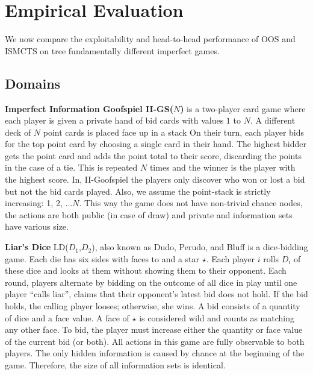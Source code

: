 \section{Empirical Evaluation}


We now compare the exploitability  and head-to-head performance
of OOS and ISMCTS on tree fundamentally different imperfect games. %

\subsection{Domains}

\textbf{Imperfect Information Goofspiel II-GS($N$)} is a two-player card game where each player is
given a private hand of bid cards with values $1$ to $N$. A different
deck of $N$ point cards is placed face up in a stack 
On their turn, each player bids for the top point card by 
choosing a single card in their hand. 
The highest bidder gets the point card and adds the point total to their score, discarding
the points in the case of a tie. 
This is repeated $N$ times and the winner is the player with the highest score.
In, II-Goofspiel the players only discover who won or lost a bid but not the bid cards played.
Also, we assume the point-stack is strictly increasing: 1, 2, $\ldots N$.
This way the game does not have non-trivial chance nodes, the actions are both public (in case of draw) and private and information sets have various size.

\textbf{Liar's Dice} LD($D_1$,$D_2$), also known as Dudo, Perudo, and Bluff is a dice-bidding game. 
Each die has six sides with faces  to  and a star $\star$. 
Each player $i$ rolls $D_i$ of these dice and looks at them without showing them to their opponent. 
Each round, players alternate by bidding on the outcome of all dice in play until one player ``calls liar'', 
\ie claims that their opponent's latest bid does not hold.
If the bid holds, the calling player looses; otherwise, she wins.
A bid consists of a quantity of dice and a face value.  
A face of $\star$ is considered wild and counts as matching any other face.
To bid, the player must increase either the quantity or face value of the current 
bid (or both).
All actions in this game are fully observable to both players. The only hidden information is caused by chance at the beginning of the game. Therefore, the size of all information sets is identical. 


